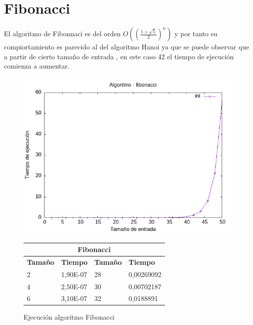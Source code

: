 \documentclass[11pt,openany]{book}
\begin{document}
\section*{Fibonacci}
El algoritmo de Fibonnaci es del orden $O((\frac{1+\sqrt{5}}{2})^n)$ y por tanto su compiortamiento es parecido al del algoritmo Hanoi ya que se puede
observar que a partir de cierto tamaño de entrada , en este caso 42 el tiempo de ejecución comienza a aumentar.
\begin{figure}[H]
    \begin{minipage}{0.5\textwidth}
        \centering
        \includegraphics[width=\linewidth]{assets/Img/fibonacciint.png}
        \caption{Ejecución algoritmo Fibonacci}
        \label{fig:fibonacci}
    \end{minipage}%
    \begin{minipage}{0.5\textwidth}
        \centering
        \small
        \begin{tabular}{|l|l|l|l|}
            \hline
            \multicolumn{4}{|c|}{\cellcolor{blue!20}\textbf{Fibonacci}}           \\ \hline
            \textbf{Tamaño} & \textbf{Tiempo} & \textbf{Tamaño} & \textbf{Tiempo} \\ \hline
            2               & 1,90E-07        & 28              & 0,00269092      \\ \hline
            4               & 2,50E-07        & 30              & 0,00702187      \\ \hline
            6               & 3,10E-07        & 32              & 0,0188891       \\ \hline

\end{tabular}
\end{minipage}
\end{figure}
\end{document}
